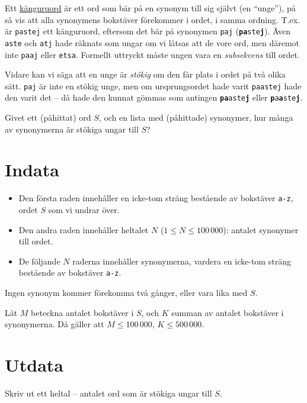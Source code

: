 
Ett \href{https://en.wikipedia.org/wiki/Kangaroo_word}{känguruord} är ett ord som bär på en synonym till sig självt (en ``unge''), på så vis att alla synonymens bokstäver förekommer i ordet, i samma ordning.
T.ex. är \texttt{pastej} ett känguruord, eftersom det bär på synonymen \texttt{paj} (\texttt{\textbf{pa}ste\textbf{j}}).
Även \texttt{aste} och \texttt{atj} hade räknats som ungar om vi låtsas att de vore ord, men däremot inte \texttt{paaj} eller \texttt{etsa}.
Formellt uttryckt måste ungen vara en \emph{subsekvens} till ordet.

Vidare kan vi säga att en unge är \emph{stökig} om den får plats i ordet på två olika sätt.
\texttt{paj} är inte en stökig unge, men om ursprungsordet hade varit \texttt{paastej} hade den varit det --
då hade den kunnat gömmas som antingen \texttt{\textbf{pa}aste\textbf{j}} eller \texttt{\textbf{p}a\textbf{a}ste\textbf{j}}.

Givet ett (påhittat) ord $S$, och en lista med (påhittade) synonymer, hur många av synonymerna är stökiga ungar till $S$?

\section*{Indata}
\begin{itemize}
  \item
    Den första raden innehåller en icke-tom sträng bestående av bokstäver \texttt{a-z}, ordet $S$ som vi undrar över.

  \item
    Den andra raden innehåller heltalet $N$ ($1 \le N \le 100\,000$): antalet synonymer till ordet.

  \item
    De följande $N$ raderna innehåller synonymerna, vardera en icke-tom sträng bestående av bokstäver \texttt{a-z}.
\end{itemize}

Ingen synonym kommer förekomma två gånger, eller vara lika med $S$.

Låt $M$ beteckna antalet bokstäver i $S$, och $K$ summan av antalet bokstäver i synonymerna.
Då gäller att $M \le 100\,000$, $K \le 500\,000$.

\section*{Utdata}
Skriv ut ett heltal -- antalet ord som är stökiga ungar till $S$.

